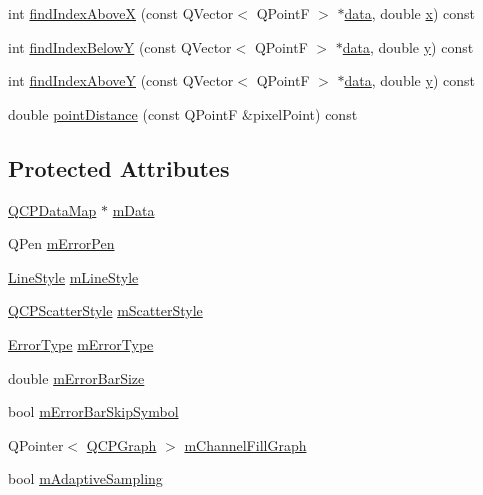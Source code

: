 \begin{DoxyCompactItemize}
\item 
int \hyperlink{class_q_c_p_graph_abab2a75b5e63630432bdd1f3b57f07fa}{find\+Index\+Above\+X} (const Q\+Vector$<$ Q\+Point\+F $>$ $\ast$\hyperlink{class_q_c_p_graph_a2f58436df4f86a2792b776a21642b3d9}{data}, double \hyperlink{_v_s_a___u_t_2_comparision_pictures_2_createtest_image_8m_a9336ebf25087d91c818ee6e9ec29f8c1}{x}) const 
\item 
int \hyperlink{class_q_c_p_graph_a6c4d556de3d1e02f548401001f72c6ff}{find\+Index\+Below\+Y} (const Q\+Vector$<$ Q\+Point\+F $>$ $\ast$\hyperlink{class_q_c_p_graph_a2f58436df4f86a2792b776a21642b3d9}{data}, double \hyperlink{_v_s_a___u_t_2_comparision_pictures_2_createtest_image_8m_a2fb1c5cf58867b5bbc9a1b145a86f3a0}{y}) const 
\item 
int \hyperlink{class_q_c_p_graph_adf50243f1df203883a2187089734bfcb}{find\+Index\+Above\+Y} (const Q\+Vector$<$ Q\+Point\+F $>$ $\ast$\hyperlink{class_q_c_p_graph_a2f58436df4f86a2792b776a21642b3d9}{data}, double \hyperlink{_v_s_a___u_t_2_comparision_pictures_2_createtest_image_8m_a2fb1c5cf58867b5bbc9a1b145a86f3a0}{y}) const 
\item 
double \hyperlink{class_q_c_p_graph_af93762a12a481a7edb4b3dd9e330dff1}{point\+Distance} (const Q\+Point\+F \&pixel\+Point) const 
\end{DoxyCompactItemize}
\subsection*{Protected Attributes}
\begin{DoxyCompactItemize}
\item 
\hyperlink{qcustomplot_8h_a84a9c4a4c2216ccfdcb5f3067cda76e3}{Q\+C\+P\+Data\+Map} $\ast$ \hyperlink{class_q_c_p_graph_a8457c840f69a0ac49f61d30a509c5d08}{m\+Data}
\item 
Q\+Pen \hyperlink{class_q_c_p_graph_aa35681a24165c2831301091a87b662ce}{m\+Error\+Pen}
\item 
\hyperlink{class_q_c_p_graph_ad60175cd9b5cac937c5ee685c32c0859}{Line\+Style} \hyperlink{class_q_c_p_graph_a8604fd98402035a63375849f7341ee25}{m\+Line\+Style}
\item 
\hyperlink{class_q_c_p_scatter_style}{Q\+C\+P\+Scatter\+Style} \hyperlink{class_q_c_p_graph_a4aa36241f166ccd1f75fc8f24e4a3247}{m\+Scatter\+Style}
\item 
\hyperlink{class_q_c_p_graph_ad23b514404bd2cb3216f57c90904d6af}{Error\+Type} \hyperlink{class_q_c_p_graph_a29e64273db201aeadebc61c870720a36}{m\+Error\+Type}
\item 
double \hyperlink{class_q_c_p_graph_a7b51c8d09510f9d195b5e765ccbcf05b}{m\+Error\+Bar\+Size}
\item 
bool \hyperlink{class_q_c_p_graph_acf631d7dbd1055a69ab3b63094868557}{m\+Error\+Bar\+Skip\+Symbol}
\item 
Q\+Pointer$<$ \hyperlink{class_q_c_p_graph}{Q\+C\+P\+Graph} $>$ \hyperlink{class_q_c_p_graph_a2f1777c7accf8244fc640c33f0b04577}{m\+Channel\+Fill\+Graph}
\item 
bool \hyperlink{class_q_c_p_graph_aa951e78aeba714cf443be6da2e52502e}{m\+Adaptive\+Sampling}
\end{DoxyCompactItemize}
